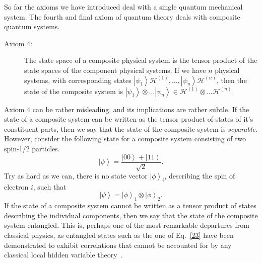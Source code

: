 \documentclass{article}
\newcommand{\ket}[1]{\left|#1\right\rangle}
\newcommand\defn[1]{\textsl{#1}}
\newcommand\cH{{\mathscr{H}}}
\begin{document}
So far the axioms we have introduced deal with a single quantum mechanical
system. The fourth and final axiom of quantum theory deals with composite
quantum systems.
\begin{description}
\item[Axiom 4:]  The state space of a composite physical system is the tensor
product of the state spaces of the component physical systems.  If we have $n$
physical systems, with corresponding states $\ket{\psi_1}\cH^{(1)}, \ldots, \ket{\psi_n}\cH^{(n)}$, then the state of the composite system is $\ket{\psi_1}\otimes\ldots\ket{\psi_n}\in\cH^{(1)}\otimes\ldots\cH^{(n)}$.  
\end{description}
Axiom 4 can be rather misleading, and its implications are rather subtle.  If the state of a composite system can be written as the tensor product of states of it's constituent parts, then we say that the state of the composite system is \defn{separable}.  However, consider the following state for a composite system consisting of two spin-1/2 particles.
\begin{equation}
\ket{\psi}=\frac{\ket{00}+\ket{11}}{\sqrt{2}}.
\label{22}
\end{equation}
Try as hard as we can, there is no state vector $\ket{\phi}_i$, describing the
spin of electron $i$, such that 
\begin{equation}
\ket{\psi}=\ket{\phi}_1\otimes\ket{\phi}_2.
\label{23}
\end{equation}
If the state of a composite system cannot be written as a tensor product of states
describing the individual components, then we say that the state of the
composite system entangled.  This is, perhaps one of the most remarkable departures from classical physics, as entangled states such as the one of Eq.~\eqref{23} have been demonstrated to exhibit correlations that cannot be accounted for by any classical local hidden variable theory~\cite{Bell}.  
\end{document}
